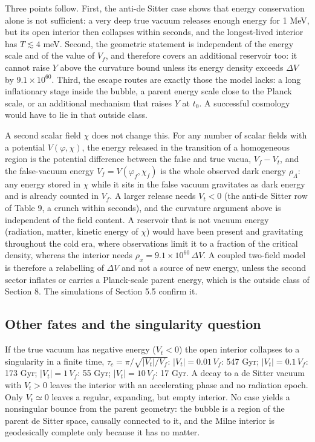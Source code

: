 \documentclass[11pt,a4paper]{article}
\begin{document}
Three points follow. First, the anti-de Sitter case shows that energy conservation alone is not sufficient: a very deep true vacuum releases enough energy for 1 MeV, but its open interior then collapses within seconds, and the longest-lived interior has $T\lesssim4$ meV. Second, the geometric statement is independent of the energy scale and of the value of $V_f$, and therefore covers an additional reservoir too: it cannot raise $Y$ above the curvature bound unless its energy density exceeds $\Delta V$ by $9.1\times10^{60}$. Third, the escape routes are exactly those the model lacks: a long inflationary stage inside the bubble, a parent energy scale close to the Planck scale, or an additional mechanism that raises $Y$ at $t_0$. A successful cosmology would have to lie in that outside class.

A second scalar field $\chi$ does not change this. For any number of scalar fields with a potential $V(\varphi,\chi)$, the energy released in the transition of a homogeneous region is the potential difference between the false and true vacua, $V_f-V_t$, and the false-vacuum energy $V_f=V(\varphi_f,\chi_f)$ is the whole observed dark energy $\rho_\Lambda$: any energy stored in $\chi$ while it sits in the false vacuum gravitates as dark energy and is already counted in $V_f$. A larger release needs $V_t<0$ (the anti-de Sitter row of Table 9, a crunch within seconds), and the curvature argument above is independent of the field content. A reservoir that is not vacuum energy (radiation, matter, kinetic energy of $\chi$) would have been present and gravitating throughout the cold era, where observations limit it to a fraction of the critical density, whereas the interior needs $\rho_x=9.1\times10^{60}\,\Delta V$. A coupled two-field model is therefore a relabelling of $\Delta V$ and not a source of new energy, unless the second sector inflates or carries a Planck-scale parent energy, which is the outside class of Section 8. The simulations of Section 5.5 confirm it.

\subsection{Other fates and the singularity question}
If the true vacuum has negative energy ($V_t<0$) the open interior collapses to a singularity in a finite time, $\tau_c = \pi/\sqrt{|V_t|/V_f}$: $|V_t|=0.01\,V_f$: 547 Gyr; $|V_t|=0.1\,V_f$: 173 Gyr; $|V_t|=1\,V_f$: 55 Gyr; $|V_t|=10\,V_f$: 17 Gyr. A decay to a de Sitter vacuum with $V_t>0$ leaves the interior with an accelerating phase and no radiation epoch. Only $V_t\simeq0$ leaves a regular, expanding, but empty interior. No case yields a nonsingular bounce from the parent geometry: the bubble is a region of the parent de Sitter space, causally connected to it, and the Milne interior is geodesically complete only because it has no matter.
\end{document}
